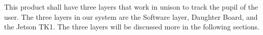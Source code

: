 
This product shall have three layers that work in unison to track the pupil of the user. The three layers in our system are the Software layer, Daughter Board, and the Jetson TK1. The three layers will be discussed more in the following sections.